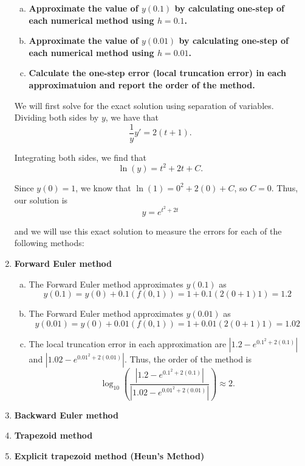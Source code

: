 \documentclass[11pt]{article}
\theoremstyle{definition}
\begin{document}
\begin{enumerate}
    \begin{enumerate}[a)]
        \item \textbf{Approximate the value of $y(0.1)$ by calculating one-step of each numerical method using $h = 0.1$.}
        \item \textbf{Approximate the value of $y(0.01)$ by calculating one-step of each numerical method using $h = 0.01$.}
        \item \textbf{Calculate the one-step error (local truncation error) in each approximatuion and report the order of the method.}
    \end{enumerate}

    We will first solve for the exact solution using separation of variables. Dividing both sides by $y$, we have that
    \[ \frac{1}{y} y' = 2(t+1).\]

    Integrating both sides, we find that 
    \[ \ln(y) = t^2 + 2t + C.\]

    Since $y(0) = 1$, we know that $\ln(1) = 0^2 + 2(0) + C$, so $C=0$. Thus, our solution is 
    \[ \boxed{y = e^{t^2 + 2t}} \]

    and we will use this exact solution to measure the errors for each of the following methods:


    \item \textbf{Forward Euler method}
    
    \begin{enumerate}[a)]
        \item The Forward Euler method approximates $y(0.1)$ as \[ y(0.1) = y(0) + 0.1(f(0, 1)) = 1 + 0.1(2(0+1)1) = \boxed{1.2} \]
        \item The Forward Euler method approximates $y(0.01)$ as \[ y(0.01) = y(0) + 0.01(f(0, 1)) = 1 + 0.01(2(0+1)1) = \boxed{1.02} \]
        \item The local truncation error in each approximation are $\left|1.2 - e^{0.1^2 + 2(0.1)}\right|$ and $\left|1.02 - e^{0.01^2 + 2(0.01)} \right|.$ 
         Thus, the order of the method is \[ \log_{10} \left( \frac{\left|1.2 - e^{0.1^2 + 2(0.1)}\right|}{\left|1.02 - e^{0.01^2 + 2(0.01)} \right|} \right) \approx \boxed{2}. \]
    \end{enumerate}
    \item \textbf{Backward Euler method}
    \item \textbf{Trapezoid method}
    \item \textbf{Explicit trapezoid method (Heun's Method)}
    

\end{enumerate}
\end{document}

